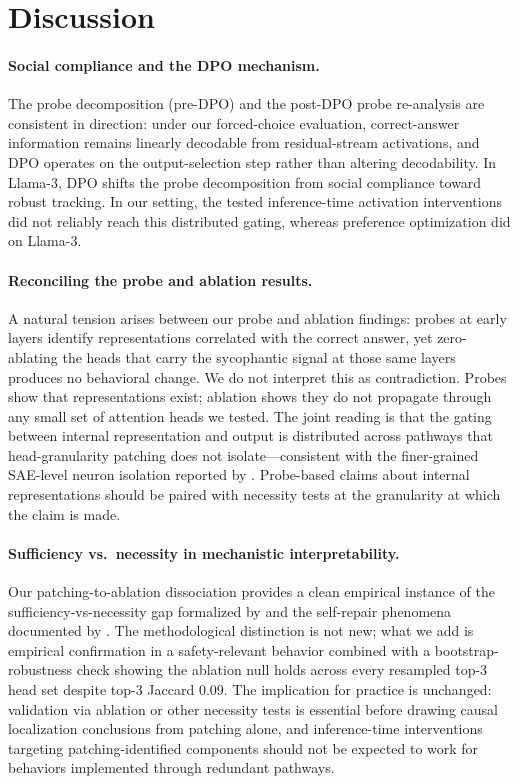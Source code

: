 \documentclass{article}
\begin{document}
\section{Discussion}
\label{sec:discussion}

\paragraph{Social compliance and the DPO mechanism.}
The probe decomposition (pre-DPO) and the post-DPO probe re-analysis are consistent in direction: under our forced-choice evaluation, correct-answer information remains linearly decodable from residual-stream activations, and DPO operates on the output-selection step rather than altering decodability. In Llama-3, DPO shifts the probe decomposition from social compliance toward robust tracking. In our setting, the tested inference-time activation interventions did not reliably reach this distributed gating, whereas preference optimization did on Llama-3.

\paragraph{Reconciling the probe and ablation results.}
A natural tension arises between our probe and ablation findings: probes at early layers identify representations correlated with the correct answer, yet zero-ablating the heads that carry the sycophantic signal at those same layers produces no behavioral change. We do not interpret this as contradiction. Probes show that representations exist; ablation shows they do not propagate through any small set of attention heads we tested. The joint reading is that the gating between internal representation and output is distributed across pathways that head-granularity patching does not isolate---consistent with the finer-grained SAE-level neuron isolation reported by \citet{obrien2026fewbad}. Probe-based claims about internal representations should be paired with necessity tests at the granularity at which the claim is made.

\paragraph{Sufficiency vs.\ necessity in mechanistic interpretability.}
Our patching-to-ablation dissociation provides a clean empirical instance of the sufficiency-vs-necessity gap formalized by \citet{heimersheim2024patching} and the self-repair phenomena documented by \citet{mcgrath2023hydra, rushing2024explorations}. The methodological distinction is not new; what we add is empirical confirmation in a safety-relevant behavior combined with a bootstrap-robustness check showing the ablation null holds across every resampled top-3 head set despite top-3 Jaccard 0.09. The implication for practice is unchanged: validation via ablation or other necessity tests is essential before drawing causal localization conclusions from patching alone, and inference-time interventions targeting patching-identified components should not be expected to work for behaviors implemented through redundant pathways.
\end{document}

